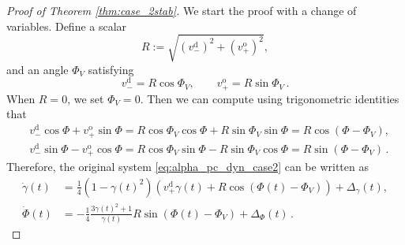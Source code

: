 \documentclass[10pt]{article}
\theoremstyle{definition}
\theoremstyle{definition}
\numberwithin{equation}{section}
\newcommand{\vDPlus}{v_+^{\text{d}}}
\newcommand{\vDMinus}{v_-^{\text{d}}}
\newcommand{\vOPlus}{v_+^{\text{o}}}
\newcommand{\Dgamma}{\Dot{\gamma}}
\newcommand{\DPhi}{\Dot{\Phi}}
\newcommand{\DeltaGamma}{\Delta_{\gamma}}
\newcommand{\DeltaPhi}{\Delta_{\Phi}}
\newcommand{\PhiV}{\Phi_{V}}
\begin{document}
\begin{proof}[Proof of Theorem \ref{thm:case_2stab}]
We start the proof with a change of variables.
Define a scalar
\begin{equation*}
    R := \sqrt{(\vDMinus)^2 + (\vOPlus)^2},
\end{equation*}
and an angle $\PhiV$ satisfying
\begin{equation}\label{eq:case2_PhiV}
\vDMinus = R \cos \PhiV, \qquad \vOPlus = R \sin \PhiV \, .
\end{equation}
When $R=0$, we set $\PhiV = 0$.
Then we can compute using trigonometric identities that
\begin{equation*}
\begin{aligned}
&\vDMinus \cos \Phi + \vOPlus \sin \Phi = R \cos \PhiV  \cos \Phi + R \sin \PhiV \sin \Phi = R \cos (\Phi - \PhiV),\\[4pt]
&\vDMinus \sin \Phi - \vOPlus \cos \Phi = R \cos \PhiV \sin \Phi - R \sin \PhiV \cos \Phi = R \sin (\Phi - \PhiV) \, .
\end{aligned}
\end{equation*}
Therefore, the original system \eqref{eq:alpha_pc_dyn_case2} can be written as
\begin{equation*}
\begin{aligned}
\Dgamma(t) &= \frac{1}{4} (1 - \gamma(t)^2) \left( \vDPlus \gamma(t) + R \cos (\Phi(t) - \PhiV) \right) + \DeltaGamma(t), \\
\DPhi(t) &= - \frac{1}{4} \frac{3\gamma(t)^2 + 1}{\gamma(t)} R \sin (\Phi(t) - \PhiV) + \DeltaPhi(t) \, .
\end{aligned}
\end{equation*}










\end{proof}
\end{document}
